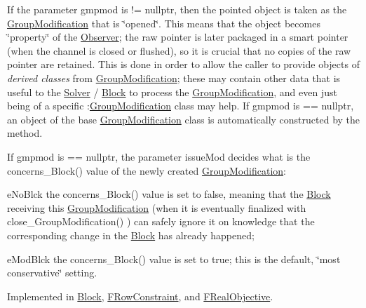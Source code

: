 If the parameter gmpmod is != nullptr, then the pointed object is taken as the \mbox{\hyperlink{class_s_m_spp__di__unipi__it_1_1_group_modification}{Group\+Modification}} that is \char`\"{}opened\char`\"{}. This means that the object becomes \char`\"{}property\char`\"{} of the \mbox{\hyperlink{class_s_m_spp__di__unipi__it_1_1_observer}{Observer}}; the raw pointer is later packaged in a smart pointer (when the channel is closed or flushed), so it is crucial that no copies of the raw pointer are retained. This is done in order to allow the caller to provide objects of {\itshape derived classes} from \mbox{\hyperlink{class_s_m_spp__di__unipi__it_1_1_group_modification}{Group\+Modification}}; these may contain other data that is useful to the \mbox{\hyperlink{class_s_m_spp__di__unipi__it_1_1_solver}{Solver}} / \mbox{\hyperlink{class_s_m_spp__di__unipi__it_1_1_block}{Block}} to process the \mbox{\hyperlink{class_s_m_spp__di__unipi__it_1_1_group_modification}{Group\+Modification}}, and even just being of a specific \+:\mbox{\hyperlink{class_s_m_spp__di__unipi__it_1_1_group_modification}{Group\+Modification}} class may help. If gmpmod is == nullptr, an object of the base \mbox{\hyperlink{class_s_m_spp__di__unipi__it_1_1_group_modification}{Group\+Modification}} class is automatically constructed by the method.

If gmpmod is == nullptr, the parameter issue\+Mod decides what is the concerns\+\_\+\+Block() value of the newly created \mbox{\hyperlink{class_s_m_spp__di__unipi__it_1_1_group_modification}{Group\+Modification}}\+:


\begin{DoxyItemize}
\item e\+No\+Blck the concerns\+\_\+\+Block() value is set to false, meaning that the \mbox{\hyperlink{class_s_m_spp__di__unipi__it_1_1_block}{Block}} receiving this \mbox{\hyperlink{class_s_m_spp__di__unipi__it_1_1_group_modification}{Group\+Modification}} (when it is eventually finalized with close\+\_\+\+Group\+Modification() ) can safely ignore it on knowledge that the corresponding change in the \mbox{\hyperlink{class_s_m_spp__di__unipi__it_1_1_block}{Block}} has already happened;
\item e\+Mod\+Blck the concerns\+\_\+\+Block() value is set to true; this is the default, \char`\"{}most conservative\char`\"{} setting. 
\end{DoxyItemize}

Implemented in \mbox{\hyperlink{class_s_m_spp__di__unipi__it_1_1_block_a6459343d63aec3d39ece1e20467db47b}{Block}}, \mbox{\hyperlink{class_s_m_spp__di__unipi__it_1_1_f_row_constraint_a6459343d63aec3d39ece1e20467db47b}{F\+Row\+Constraint}}, and \mbox{\hyperlink{class_s_m_spp__di__unipi__it_1_1_f_real_objective_a6459343d63aec3d39ece1e20467db47b}{F\+Real\+Objective}}.

